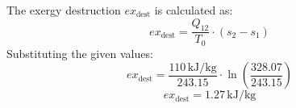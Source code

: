 The exergy destruction \( ex_{\text{dest}} \) is calculated as:  
\[
ex_{\text{dest}} = \frac{Q_{12}}{T_0} \cdot (s_2 - s_1)
\]  
Substituting the given values:  
\[
ex_{\text{dest}} = \frac{110 \, \text{kJ/kg}}{243.15} \cdot \ln\left(\frac{328.07}{243.15}\right)
\]  
\[
ex_{\text{dest}} = 1.27 \, \text{kJ/kg}
\]